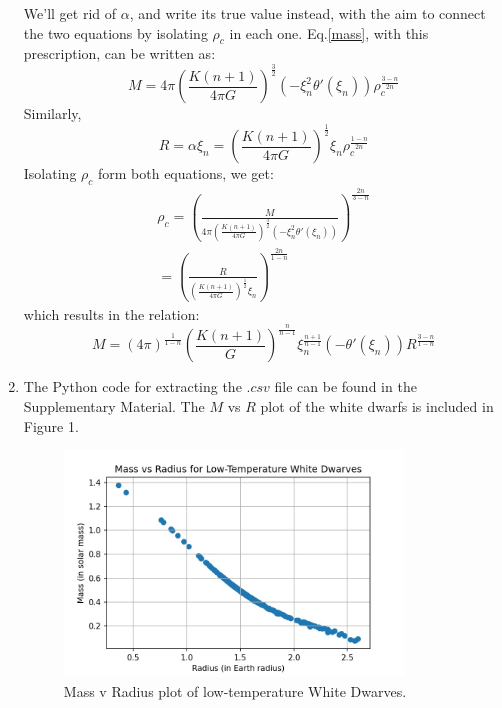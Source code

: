 \documentclass[a4paper]{article}
\begin{document}
\begin{enumerate}[label=(\alph*)]
    We'll get rid of $\alpha$, and write its true value instead, with the aim to connect the two equations by isolating $\rho_{c}$ in each one. Eq.\eqref{mass}, with this prescription, can be written as:
    \begin{equation}
        M = 4\pi \left(\frac{K(n+1)}{4\pi G}\right)^{\frac{3}{2}} \left(-\xi_{n}^{2}\theta '(\xi_{n})\right) \rho_{c}^{\frac{3-n}{2n}}
    \end{equation}
    Similarly, 
    \begin{equation}
        R = \alpha\xi_{n} = \left(\frac{K(n+1)}{4\pi G}\right)^{\frac{1}{2}} \xi_{n} \rho_{c}^{\frac{1-n}{2n}}
    \end{equation}
    Isolating $\rho_{c}$ form both equations, we get:
    \begin{align}
        \rho_{c} = \left( \frac{M}{4\pi \left(\frac{K(n+1)}{4\pi G}\right)^{\frac{3}{2}} \left(-\xi_{n}^{2}\theta '(\xi_{n})\right)} \right)^{\frac{2n}{3-n}}     \nonumber \\
        = \left( \frac{R}{\left(\frac{K(n+1)}{4\pi G}\right)^{\frac{1}{2}} \xi_{n}} \right)^{\frac{2n}{1-n}}
    \end{align}
    which results in the relation:
    \begin{equation}
        M = (4\pi)^{\frac{1}{1-n}} \left(\frac{K(n+1)}{G}\right)^{\frac{n}{n-1}} \xi_{n}^{\frac{n+1}{n-1}} (-\theta '(\xi_{n}) ) R^{\frac{3-n}{1-n}}
    \end{equation}

  \item The Python code for extracting the $.csv$ file can be found in the Supplementary Material. The $M$ vs $R$ plot of the white dwarfs is included in Figure 1.
    \begin{figure}[H] 
    \centering
    \includegraphics[width=0.85\textwidth]{WD.jpg}
    \caption{Mass v Radius plot of low-temperature White Dwarves.}
    \end{figure}


\end{enumerate}
\end{document}

